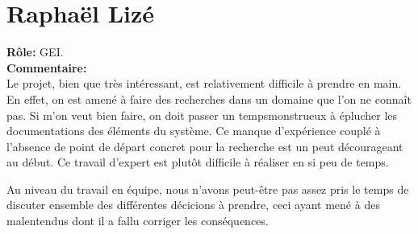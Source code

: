 \documentclass [a4paper] {report}
\begin{document}
\section*{Raphaël Lizé}

\textbf{Rôle:} GEI.\\

\textbf{Commentaire:}\\
Le projet, bien que très intéressant, est relativement difficile
à prendre en main. En effet, on est amené à faire des recherches
dans un domaine que l'on ne connaît pas. Si m'on veut bien faire,
on doit passer un tempsmonstrueux à éplucher les documentations
des éléments du système. Ce manque d'expérience couplé à l'absence
de point de départ concret pour la recherche est un peut décourageant
au début. Ce travail d'expert est plutôt difficile à réaliser en
si peu de temps.

Au niveau du travail en équipe, nous n'avons peut-être pas assez
pris le temps de discuter ensemble des différentes décicions à
prendre, ceci ayant mené à des malentendus dont il a fallu corriger
les conséquences.
\end{document}
